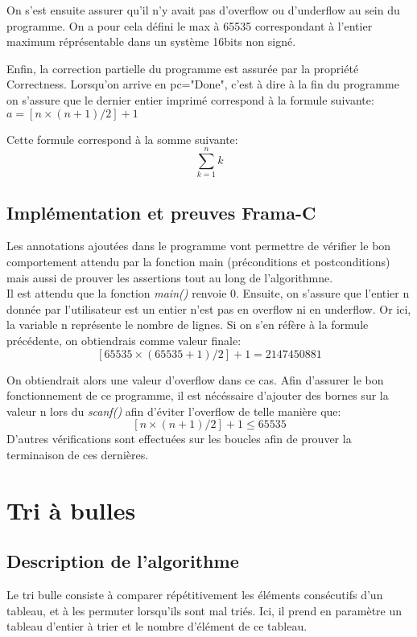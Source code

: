 \documentclass[a4paper,11pt, oneside]{book}
\begin{document}
			On s'est ensuite assurer qu'il n'y avait pas d'overflow ou d'underflow au sein
			du programme. On a pour cela défini le max à 65535 correspondant à l'entier
			maximum réprésentable dans un système 16bits non signé.

			Enfin, la correction partielle du programme est assurée par la propriété
			Correctness. Lorsqu'on arrive en pc="Done", c'est à dire à la fin du programme
			on s'assure que le dernier entier imprimé correspond à la formule suivante:
			$a = [n \times (n + 1) / 2] + 1$

			Cette formule correspond à la somme suivante: $$\sum_{k=1}^{n}k$$

		\section{Implémentation et preuves Frama-C}
		Les annotations ajoutées dans le programme vont permettre de
		vérifier le bon comportement attendu par la fonction main (préconditions et postconditions) mais
		aussi de prouver les assertions tout au long de l'algorithmne.\\

		\noindent Il est attendu que la fonction \textit{main()} renvoie 0. Ensuite,
		on s'assure que l'entier n donnée par l'utilisateur est un entier n'est pas en overflow ni en underflow.
		Or ici, la variable n représente le nombre de lignes. Si on s'en réfère à la
		formule précédente, on obtiendrais comme valeur finale:
		$$[65535 \times (65535 + 1) / 2] + 1 = 2147450881$$

		\noindent On obtiendrait alors une valeur d'overflow dans ce cas. Afin d'assurer le bon
		fonctionnement de ce programme, il est nécéssaire d'ajouter des bornes sur la valeur n lors
		du \textit{scanf()} afin d'éviter l'overflow de telle manière que:
		$$[n \times (n + 1) / 2] + 1 	\leq 65535$$
		\noindent D'autres vérifications sont effectuées sur les boucles afin de prouver la terminaison de ces dernières.

	\chapter{Tri à bulles}

		\section{Description de l'algorithme}

		Le tri bulle consiste à comparer répétitivement les éléments consécutifs d'un tableau,
		et à les permuter lorsqu'ils sont mal triés. Ici, il prend en paramètre un
		tableau d'entier à trier et le nombre d'élément de ce tableau.
\end{document}
